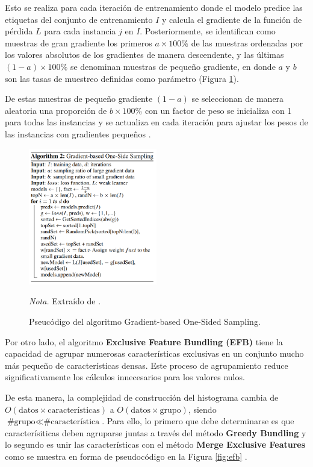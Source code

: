 Esto se realiza para cada iteración de entrenamiento donde el modelo predice las etiquetas del conjunto de entrenamiento $I$ y calcula el gradiente de la función de pérdida $L$ para cada 
instancia $j$ en $I$. Posteriormente, se identifican como muestras de gran gradiente los primeros \(a \times 100\%\) de las muestras ordenadas por los valores absolutos de los gradientes de manera descendente, y las últimas \((1-a) 
\times 100\%\) se denominan muestras de pequeño gradiente, en donde $a$ y $b$ son las tasas de muestreo definidas como parámetro (Figura \ref{fig:goss}). 

De estas muestras de pequeño gradiente $(1 - a)$ se seleccionan de manera aleatoria una proporción de $b \times 100\%$ con un factor de peso
se inicializa con 1 para todas las instancias y se actualiza en cada iteración para ajustar los pesos de las instancias con gradientes pequeños \citep{ke_lightgbm_2017}.
\begin{figure}[H]
    \centering
    \caption{Pseucódigo del algoritmo Gradient-based One-Sided Sampling.}
    \includegraphics[width=0.5\textwidth]{img/4_marco_teorico/goss.png}
    \label{fig:goss}
    \begin{flushleft}
        \textit{Nota.} Extraído de \citet{ke_lightgbm_2017}. 
        \vspace{-\baselineskip}
    \end{flushleft}
\end{figure}

Por otro lado, el algoritmo \textbf{Exclusive Feature Bundling (EFB)} tiene la capacidad de agrupar numerosas características exclusivas en un conjunto mucho más pequeño de características densas. Este proceso de agrupamiento reduce significativamente 
los cálculos innecesarios para los valores nulos. 

De esta manera, la complejidad de construcción del histograma cambia de $O(\text{datos} \times \text{características})$ a $O(\text{datos} \times \text{grupo})$, siendo $\text{\# grupo} \ll \text{\# característica}$. Para ello, lo primero
que debe determinarse es que caracterísiticas deben agruparse juntas a través del método \textbf{Greedy Bundling} y lo segundo es unir las características con el método \textbf{Merge Exclusive Features} como se 
muestra en forma de pseudocódigo en la Figura \ref{fig:efb} \citep{ke_lightgbm_2017}.

